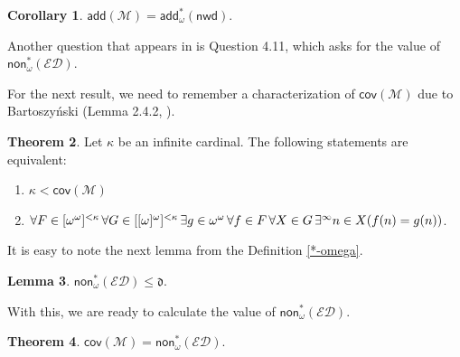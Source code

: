 \documentclass{amsart}
\theoremstyle{definition}
\newtheorem{theorem}{Theorem}[section]
\newtheorem{coro}[theorem]{Corollary}
\newtheorem{lemma}[theorem]{Lemma}
\theoremstyle{remark}
\numberwithin{equation}{section}
\newcommand{\nwd}{\mathsf{nwd}}
\newcommand{\add}{\mathsf{add}}
\newcommand{\non}{\mathsf{non}}
\newcommand{\cov}{\mathsf{cov}}
\newcommand{\ed}{\mathcal{E}\mathcal{D}}
\begin{document}
\begin{coro}
     $\add(\mathcal{M}) = \add^*_\omega(\nwd)$.
\end{coro}

Another question that appears in \cite{poke} is Question 4.11, which asks for the value of $ \non^*_\omega(\ed)$.

For the next result, we need to remember a characterization of $\cov(\mathcal{M})$ due to Bartoszy\'{n}ski (Lemma 2.4.2, \cite{barto}).

\begin{theorem}\label{cov m}
    Let $\kappa$ be an infinite cardinal. The following statements are equivalent:
    \begin{enumerate}
        \item $\kappa<\cov(\mathcal{M})$
        \item $\forall F \in [\omega^\omega]^{<\kappa} \, \forall G \in [[\omega]^\omega]^{<\kappa}    \,\exists g \in \omega^\omega\,\forall f \in F\,\forall X \in G\,\exists^\infty n \in X\\(f(n) = g(n))$.
    \end{enumerate}
\end{theorem}

It is easy to note the next lemma from the Definition \ref{*-omega}.

\begin{lemma}
    $\non^*_\omega(\ed)\leq \mathfrak{d}$.
\end{lemma}

With this, we are ready to calculate the value of $ \non^*_\omega(\ed)$.

\begin{theorem}
    $\cov(\mathcal{M}) = \non^*_\omega(\ed)$.
\end{theorem}
\end{document}
